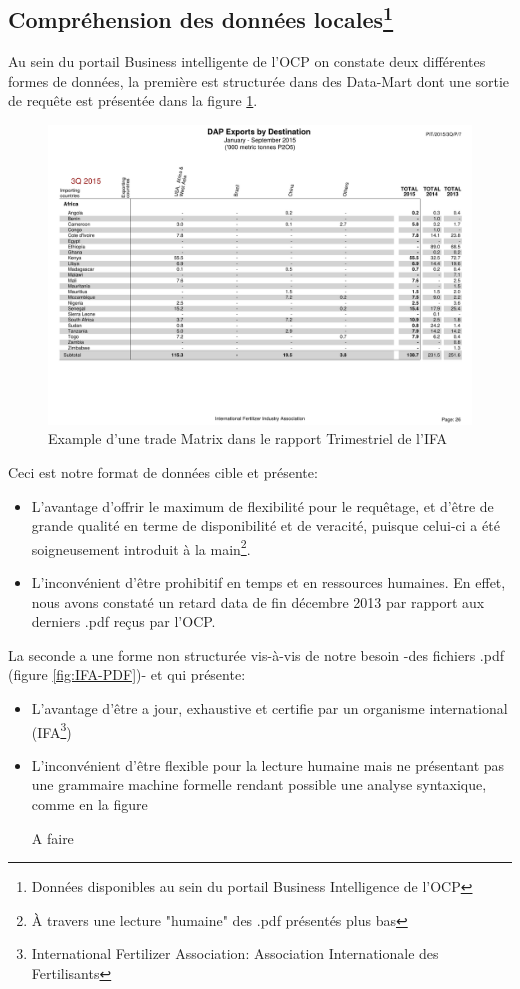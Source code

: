	\subsection{Compréhension des données locales\protect\footnote{Données disponibles au sein du portail Business Intelligence de l'OCP}}
	Au sein du portail Business intelligente de l'OCP on constate deux différentes formes de données, la première est structurée dans des Data-Mart dont une sortie de requête est présentée dans la figure \ref{fig:DMOCP}.
	 	\begin{figure}[h]
	    		\centering
    			\includegraphics[scale=0.6]{IFA_EX}
	    		\caption{Example d'une trade Matrix dans le rapport Trimestriel de l'IFA}
	    		\label{fig:DMOCP}
	\end{figure}
	\par
	Ceci est notre format de données cible et présente:
	\begin{itemize}
	\item L'avantage d’offrir le maximum de flexibilité pour le requêtage, et d'être de grande qualité en terme de disponibilité et de veracité, puisque celui-ci a été soigneusement introduit à la main\footnote{À travers une lecture "humaine" des .pdf présentés plus bas}.
	\item L’inconvénient d'être prohibitif en temps et en ressources humaines. En effet, nous avons constaté un retard data de fin décembre 2013 par rapport aux derniers .pdf reçus par l'OCP.
	\end{itemize}
	La seconde a une forme non structurée vis-à-vis de notre besoin -des fichiers .pdf (figure \ref{fig:IFA-PDF})- et qui présente:
	\begin{itemize}
	\item L'avantage d’être a jour, exhaustive et certifie par un organisme international (IFA\footnote{International Fertilizer Association: Association Internationale des Fertilisants})
	\item L’inconvénient d’être flexible pour la lecture humaine mais ne présentant pas une grammaire machine formelle rendant possible une analyse syntaxique, comme en  la figure \begin{huge}
	A faire
	\end{huge}
	\end{itemize}
